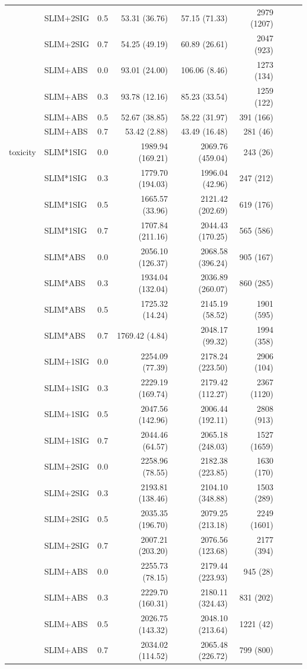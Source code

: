 \begin{longtable}{lllrrrrrr}
 & SLIM+2SIG & 0.5 & 53.31 (36.76) & 57.15 (71.33) & 2979 (1207) \\
 & SLIM+2SIG & 0.7 & 54.25 (49.19) & 60.89 (26.61) & 2047 (923) \\
 & SLIM+ABS & 0.0 & 93.01 (24.00) & 106.06 (8.46) & 1273 (134) \\
 & SLIM+ABS & 0.3 & 93.78 (12.16) & 85.23 (33.54) & 1259 (122) \\
 & SLIM+ABS & 0.5 & 52.67 (38.85) & 58.22 (31.97) & 391 (166) \\
 & SLIM+ABS & 0.7 & 53.42 (2.88) & 43.49 (16.48) & 281 (46) \\
\midrule
toxicity & SLIM*1SIG & 0.0 & 1989.94 (169.21) & 2069.76 (459.04) & 243 (26) \\
 & SLIM*1SIG & 0.3 & 1779.70 (194.03) & 1996.04 (42.96) & 247 (212) \\
 & SLIM*1SIG & 0.5 & 1665.57 (33.96) & 2121.42 (202.69) & 619 (176) \\
 & SLIM*1SIG & 0.7 & 1707.84 (211.16) & 2044.43 (170.25) & 565 (586) \\
 & SLIM*ABS & 0.0 & 2056.10 (126.37) & 2068.58 (396.24) & 905 (167) \\
 & SLIM*ABS & 0.3 & 1934.04 (132.04) & 2036.89 (260.07) & 860 (285) \\
 & SLIM*ABS & 0.5 & 1725.32 (14.24) & 2145.19 (58.52) & 1901 (595) \\
 & SLIM*ABS & 0.7 & 1769.42 (4.84) & 2048.17 (99.32) & 1994 (358) \\
 & SLIM+1SIG & 0.0 & 2254.09 (77.39) & 2178.24 (223.50) & 2906 (104) \\
 & SLIM+1SIG & 0.3 & 2229.19 (169.74) & 2179.42 (112.27) & 2367 (1120) \\
 & SLIM+1SIG & 0.5 & 2047.56 (142.96) & 2006.44 (192.11) & 2808 (913) \\
 & SLIM+1SIG & 0.7 & 2044.46 (64.57) & 2065.18 (248.03) & 1527 (1659) \\
 & SLIM+2SIG & 0.0 & 2258.96 (78.55) & 2182.38 (223.85) & 1630 (170) \\
 & SLIM+2SIG & 0.3 & 2193.81 (138.46) & 2104.10 (348.88) & 1503 (289) \\
 & SLIM+2SIG & 0.5 & 2035.35 (196.70) & 2079.25 (213.18) & 2249 (1601) \\
 & SLIM+2SIG & 0.7 & 2007.21 (203.20) & 2076.56 (123.68) & 2177 (394) \\
 & SLIM+ABS & 0.0 & 2255.73 (78.15) & 2179.44 (223.93) & 945 (28) \\
 & SLIM+ABS & 0.3 & 2229.70 (160.31) & 2180.11 (324.43) & 831 (202) \\
 & SLIM+ABS & 0.5 & 2026.75 (143.32) & 2048.10 (213.64) & 1221 (42) \\
 & SLIM+ABS & 0.7 & 2034.02 (114.52) & 2065.48 (226.72) & 799 (800) \\
\end{longtable}